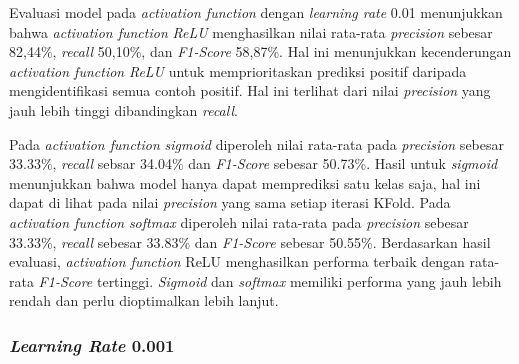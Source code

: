       Evaluasi model pada \textit{activation function} dengan \textit{learning rate} 0.01 menunjukkan bahwa \textit{activation function} \textit{ReLU} menghasilkan nilai rata-rata \textit{precision} sebesar 82,44\%, \textit{recall} 50,10\%, dan\textit{ F1-Score} 58,87\%. Hal ini menunjukkan kecenderungan \textit{activation function} \textit{ReLU} untuk memprioritaskan prediksi positif daripada mengidentifikasi semua contoh positif. Hal ini terlihat dari nilai \textit{precision} yang jauh lebih tinggi dibandingkan \textit{recall}.

     Pada \textit{activation function} \textit{sigmoid} diperoleh nilai rata-rata pada \textit{precision} sebesar 33.33\%, \textit{recall} sebsar 34.04\% dan\textit{ F1-Score} sebesar 50.73\%. Hasil untuk \textit{sigmoid} menunjukkan bahwa model hanya dapat memprediksi satu kelas saja, hal ini dapat di lihat pada nilai \textit{precision} yang sama setiap iterasi KFold. Pada \textit{activation function} \textit{softmax} diperoleh nilai rata-rata pada \textit{precision} sebesar 33.33\%, \textit{recall} sebesar 33.83\% dan \textit{F1-Score} sebesar 50.55\%.
     Berdasarkan hasil evaluasi, \textit{activation function} ReLU menghasilkan performa terbaik dengan 
     rata-rata \textit{F1-Score} tertinggi. \textit{Sigmoid} dan \textit{softmax} memiliki performa yang jauh lebih rendah dan perlu dioptimalkan lebih lanjut.


 

    \subsubsection{\textit{Learning Rate} 0.001}
    
